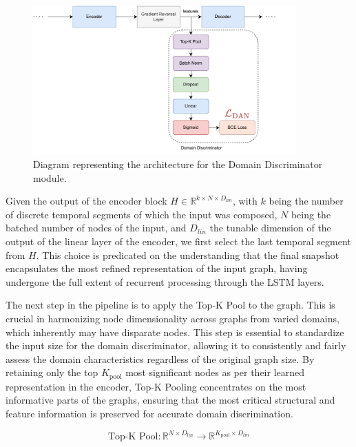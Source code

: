 \begin{figure}[!ht]
\noindent\hspace{0.5mm}\includegraphics[width=0.9\textwidth]{./figures/DomainDiscriminator.pdf}
\caption{Diagram representing the architecture for the Domain Discriminator module.}
\label{fig:DomainDiscriminator}
\end{figure}


Given the output of the encoder block $H \in \mathbb{R}^{k\times N\times D_{lin}}$, with $k$ being the number of discrete temporal segments of which the input was composed, $N$ being the batched number of nodes of the input, and $D_{lin}$ the tunable dimension of the output of the linear layer of the encoder, we first select the last temporal segment from $H$. This choice is predicated on the understanding that the final snapshot encapsulates the most refined representation of the input graph, having undergone the full extent of recurrent processing through the \gls{LSTM} layers.

The next step in the pipeline is to apply the Top-K Pool to the graph. This is crucial in harmonizing node dimensionality across graphs from varied domains, which inherently may have disparate nodes. This step is essential to standardize the input size for the domain discriminator, allowing it to consistently and fairly assess the domain characteristics regardless of the original graph size. By retaining only the top $K_\text{pool}$ most significant nodes as per their learned representation in the encoder, Top-K Pooling concentrates on the most informative parts of the graphs, ensuring that the most critical structural and feature information is preserved for accurate domain discrimination.

\begin{equation}
	\text{Top-K Pool}:  \mathbb{R}^{N\times D_{lin}} \rightarrow \mathbb{R}^{K_\text{pool} \times D_{lin}}
\end{equation}

